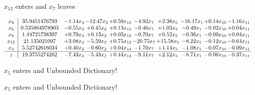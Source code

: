 \documentclass[9pt]{article}
\begin{document}
 $ x_{12} $ enters and $ x_{7} $ leaves 

 \[\begin{array}{c| c c@{\hskip 2pt} c@{\hskip 2pt} c@{\hskip 2pt} c@{\hskip 2pt} c@{\hskip 2pt} c@{\hskip 2pt} c@{\hskip 2pt} c@{\hskip 2pt} }
 x_{9}   &  35.9451476793 & -1.14 x_{4} & -12.47 x_{2} & +  0.59 x_{13} & -4.92 x_{7} & +  2.38 x_{5} & -16.17 x_{1} & +  0.14 x_{10} & -1.16 x_{11}\\
 x_{6}   &  0.535864978903 & -0.55 x_{4} & +  0.45 x_{2} & +  0.13 x_{13} & -0.46 x_{7} & +  1.03 x_{5} & -0.49 x_{1} & -0.02 x_{10} & +  0.04 x_{11}\\
 x_{8}   &  1.44725738397 & +  0.79 x_{4} & +  0.13 x_{2} & +  0.03 x_{13} & -0.70 x_{7} & +  0.52 x_{5} & -0.36 x_{1} & -0.09 x_{10} & +  0.04 x_{11}\\
 x_{12}   &  21.135021097 & +  3.08 x_{4} & -5.59 x_{2} & +  0.75 x_{13} & -20.75 x_{7} & + 15.58 x_{5} & -8.22 x_{1} & -0.12 x_{10} & -0.64 x_{11}\\
 x_{3}   &  5.52742616034 & +  0.40 x_{4} & -0.60 x_{2} & +  0.04 x_{13} & -1.70 x_{7} & +  1.14 x_{5} & -1.08 x_{1} & -0.07 x_{10} & -0.09 x_{11}\\
\hline
z    &  19.3755274262 & -7.43 x_{4} & -5.43 x_{2} & +  0.44 x_{13} & -9.11 x_{7} & +  2.12 x_{5} & -8.71 x_{1} & -0.06 x_{10} & -0.37 x_{11}\\
\end{array}\]


 $ x_{5} $ enters and Unbounded Dictionary!


 $ x_{5} $ enters and Unbounded Dictionary!
\end{document}

